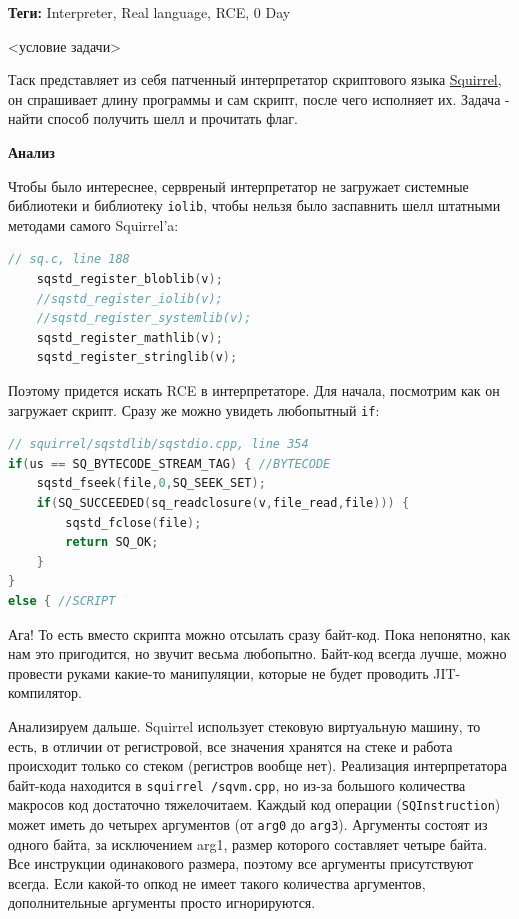 \documentclass[idxtotoc,hyperref,openany,oneside]{files/pwn} %
\begin{document}


\textbf{Теги:} Interpreter, Real language, RCE, 0 Day\vspace{\baselineskip}

\begin{tcolorbox}
<условие задачи>
\end{tcolorbox}

Таск представляет из себя патченный интерпретатор скриптового языка \href{http://squirrel-lang.org/}{Squirrel}, он спрашивает длину программы и сам скрипт, после чего исполняет их. Задача - найти способ получить шелл и прочитать флаг.

\textbf{Анализ}

Чтобы было интереснее, сервреный интерпретатор не загружает системные библиотеки и библиотеку \verb|iolib|, чтобы нельзя было заспавнить шелл штатными методами самого Squirrel'a:
\begin{lstlisting}[language=C]
// sq.c, line 188
	sqstd_register_bloblib(v);
	//sqstd_register_iolib(v);
	//sqstd_register_systemlib(v);
	sqstd_register_mathlib(v);
	sqstd_register_stringlib(v);
\end{lstlisting}

Поэтому придется искать RCE в интерпретаторе. Для начала, посмотрим как он загружает скрипт. Сразу же можно увидеть любопытный \verb|if|:
\begin{lstlisting}[language=C]
// squirrel/sqstdlib/sqstdio.cpp, line 354
if(us == SQ_BYTECODE_STREAM_TAG) { //BYTECODE
    sqstd_fseek(file,0,SQ_SEEK_SET);
    if(SQ_SUCCEEDED(sq_readclosure(v,file_read,file))) {
        sqstd_fclose(file);
        return SQ_OK;
    }
}
else { //SCRIPT
\end{lstlisting}

Ага! То есть вместо скрипта можно отсылать сразу байт-код. Пока непонятно, как нам это пригодится, но звучит весьма любопытно. Байт-код всегда лучше, можно провести руками какие-то манипуляции, которые не будет проводить JIT-компилятор. 

Анализируем дальше. Squirrel использует стековую виртуальную машину, то есть, в отличии от регистровой, все значения хранятся на стеке и работа происходит только со стеком (регистров вообще нет). Реализация интерпретатора байт-кода находится в \verb|squirrel /sqvm.cpp|, но из-за большого количества макросов код достаточно тяжелочитаем. Каждый код операции (\verb|SQInstruction|) может иметь до четырех аргументов (от \verb|arg0| до \verb|arg3|). Аргументы состоят из одного байта, за исключением arg1, размер которого составляет четыре байта. Все инструкции одинакового размера, поэтому все аргументы присутствуют всегда. Если какой-то опкод не имеет такого количества аргументов, дополнительные аргументы просто игнорируются. 
\end{document}
